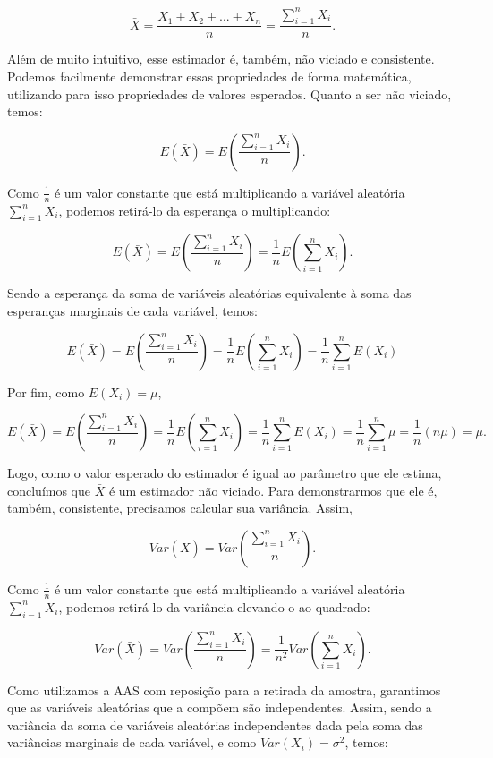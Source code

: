 \documentclass[
  letterpaper,
  DIV=11,
  numbers=noendperiod]{scrreprt}
\begin{document}
\[
\bar{X} = \frac{X_1 + X_2 + ... + X_{n}}{n} = \frac{\sum_{i = 1}^{n} X_i}{n}.
\]

Além de muito intuitivo, esse estimador é, também, não viciado e
consistente. Podemos facilmente demonstrar essas propriedades de forma
matemática, utilizando para isso propriedades de valores esperados.
Quanto a ser não viciado, temos:

\[
E(\bar{X}) = E\left(\frac{\sum_{i = 1}^{n} X_i}{n}\right).
\]

Como \(\frac{1}{n}\) é um valor constante que está multiplicando a
variável aleatória \(\sum_{i = 1}^{n} X_i\), podemos retirá-lo da
esperança o multiplicando:

\[
E(\bar{X}) = E\left(\frac{\sum_{i = 1}^{n} X_i}{n}\right) = \frac{1}{n}E\left(\sum_{i = 1}^{n} X_i\right).
\]

Sendo a esperança da soma de variáveis aleatórias equivalente à soma das
esperanças marginais de cada variável, temos:

\[
E(\bar{X}) = E\left(\frac{\sum_{i = 1}^{n} X_i}{n}\right) = \frac{1}{n}E\left(\sum_{i = 1}^{n} X_i\right) = \frac{1}{n} \sum_{i = 1}^{n}  E\left(X_i\right)
\]

Por fim, como \(E(X_i) = \mu\),

\[
E(\bar{X}) = E\left(\frac{\sum_{i = 1}^{n} X_i}{n}\right) = \frac{1}{n}E\left(\sum_{i = 1}^{n} X_i\right) = \frac{1}{n} \sum_{i = 1}^{n}  E\left(X_i\right) = \frac{1}{n} \sum_{i = 1}^{n} \mu = \frac{1}{n} (n\mu) = \mu.
\]

Logo, como o valor esperado do estimador é igual ao parâmetro que ele
estima, concluímos que \(\bar{X}\) é um estimador não viciado. Para
demonstrarmos que ele é, também, consistente, precisamos calcular sua
variância. Assim,

\[
Var(\bar{X}) = Var\left(\frac{\sum_{i = 1}^{n} X_i}{n}\right).
\]

Como \(\frac{1}{n}\) é um valor constante que está multiplicando a
variável aleatória \(\sum_{i = 1}^{n} X_i\), podemos retirá-lo da
variância elevando-o ao quadrado:

\[
Var(\bar{X}) = Var\left(\frac{\sum_{i = 1}^{n} X_i}{n}\right) = \frac{1}{n^2} Var\left(\sum_{i = 1}^{n} X_i\right).
\]

Como utilizamos a AAS com reposição para a retirada da amostra,
garantimos que as variáveis aleatórias que a compõem são independentes.
Assim, sendo a variância da soma de variáveis aleatórias independentes
dada pela soma das variâncias marginais de cada variável, e como
\(Var(X_i) = \sigma^2\), temos:
\end{document}
